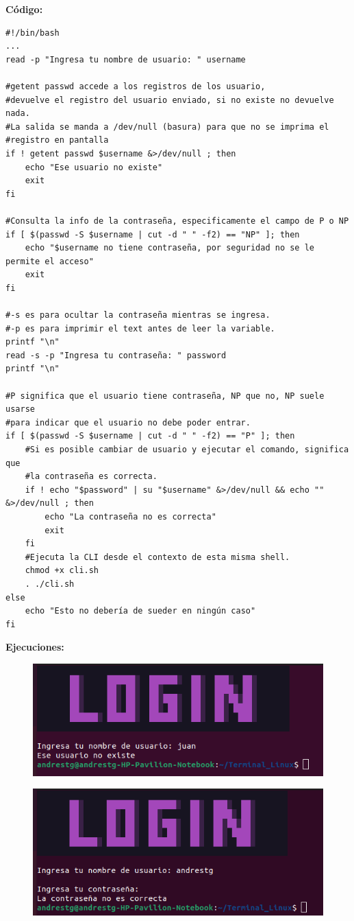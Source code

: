\documentclass[letter,12pt]{article} %
\begin{document}
\textbf{Código:} \par
\begin{lstlisting}[style=BashInputStyle]
#!/bin/bash
...
read -p "Ingresa tu nombre de usuario: " username

#getent passwd accede a los registros de los usuario,
#devuelve el registro del usuario enviado, si no existe no devuelve nada.
#La salida se manda a /dev/null (basura) para que no se imprima el 
#registro en pantalla
if ! getent passwd $username &>/dev/null ; then
    echo "Ese usuario no existe"
    exit
fi

#Consulta la info de la contraseña, especificamente el campo de P o NP
if [ $(passwd -S $username | cut -d " " -f2) == "NP" ]; then
    echo "$username no tiene contraseña, por seguridad no se le permite el acceso"
    exit
fi

#-s es para ocultar la contraseña mientras se ingresa.
#-p es para imprimir el text antes de leer la variable.
printf "\n"
read -s -p "Ingresa tu contraseña: " password
printf "\n"

#P significa que el usuario tiene contraseña, NP que no, NP suele usarse
#para indicar que el usuario no debe poder entrar.
if [ $(passwd -S $username | cut -d " " -f2) == "P" ]; then
    #Si es posible cambiar de usuario y ejecutar el comando, significa que 
    #la contraseña es correcta.
    if ! echo "$password" | su "$username" &>/dev/null && echo "" &>/dev/null ; then
        echo "La contraseña no es correcta"
        exit
    fi
    #Ejecuta la CLI desde el contexto de esta misma shell.
    chmod +x cli.sh
    . ./cli.sh
else
    echo "Esto no debería de sueder en ningún caso"
fi
\end{lstlisting}
\newpage

\textbf{Ejecuciones:} \par
\begin{figure}[H]
	\centering
	\includegraphics[scale=0.7]{imagenes/acceso.png}
\end{figure}
\begin{figure}[H]
	\centering
	\includegraphics[scale=0.7]{imagenes/acceso2.png}
\end{figure}
\end{document}
